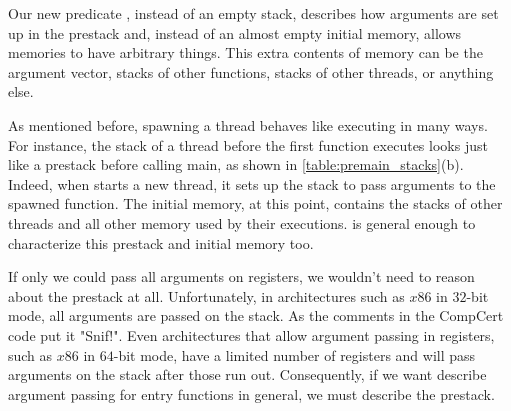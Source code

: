 Our new predicate , instead of an empty stack, describes how arguments are set up in the prestack and, instead of an almost empty initial memory, allows memories to have arbitrary things. This extra contents of memory can be the argument vector, stacks of other functions, stacks of other threads, or anything else.   

%
%
%

As mentioned before, spawning a thread behaves like executing \main in many ways. For instance, the stack of a thread before the first function executes looks just like a prestack before calling main, as shown in \autoref{table:premain_stacks}(b). Indeed, when  starts a new thread, it sets up the stack to pass arguments to the spawned function. The initial memory, at this point, contains the stacks of other threads and all other memory used by their executions.  is general enough to characterize this prestack and initial memory too.

If only we could pass all arguments on registers, we wouldn't need to reason about the prestack at all. 
Unfortunately, in architectures such as $x86$ in $32$-bit mode, all arguments are passed on the stack. As the comments in the CompCert code put it "Snif!"\cite{leroy19:compcert}. Even architectures that allow argument passing in registers, such as $x86$ in $64$-bit mode, have a limited number of registers and will pass arguments on the stack after those run out. Consequently, if we want describe argument passing for entry functions in general, we must describe the prestack.

